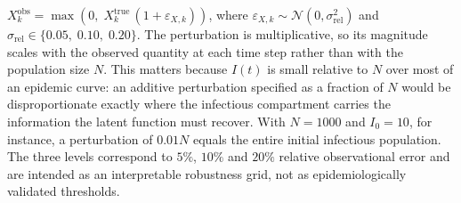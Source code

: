 %
%
%


%
%

$X_k^{\mathrm{obs}}=\max\!\left(0,\;X_k^{\mathrm{true}}\,(1+\varepsilon_{X,k})\right)$,
where $\varepsilon_{X,k}\sim \mathcal{N}(0,\sigma_{\mathrm{rel}}^2)$ and
$\sigma_{\mathrm{rel}} \in \{0.05,\;0.10,\;0.20\}$. The perturbation is
multiplicative, so its magnitude scales with the observed quantity at each
time step rather than with the population size $N$. This matters because
$I(t)$ is small relative to $N$ over most of an epidemic curve: an additive
perturbation specified as a fraction of $N$ would be disproportionate
exactly where the infectious compartment carries the information the latent
function must recover. With $N=1000$ and $I_0=10$, for instance, a
perturbation of $0.01N$ equals the entire initial infectious population. The
three levels correspond to $5\%$, $10\%$ and $20\%$ relative observational
error and are intended as an interpretable robustness grid, not as
epidemiologically validated thresholds.



